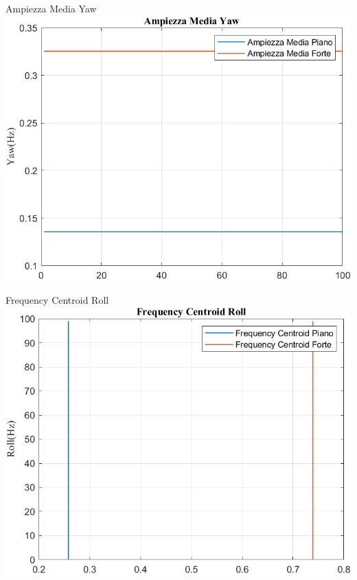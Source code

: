 	\begin{frame}{{Ampiezza Media Yaw}}					
		\centering\includegraphics[height=.8\textheight]{figure/VAng/Trasformata/Ampiezza MediaYaw}
	\end{frame}
	
	\begin{frame}{{Frequency Centroid Roll}}
		\centering\includegraphics[height=.8\textheight]{figure/VAng/Trasformata/Frequency CentroidRoll}
	\end{frame}
	
